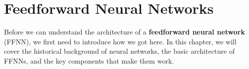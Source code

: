 \section{Feedforward Neural Networks}
Before we can understand the architecture of a \textbf{feedforward neural network} (FFNN), we first need to introduce
how we got here. In this chapter, we will cover the historical background of neural networks, the basic architecture of FFNNs, and the key components that make them work.







